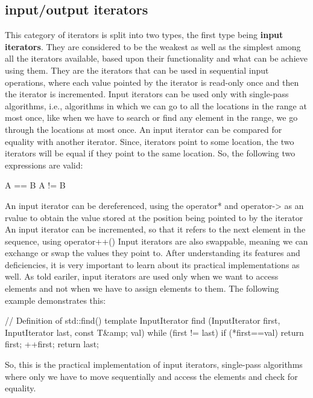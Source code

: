 \documentclass{report}
\begin{document}
\subsection*{input/output iterators}
This category of iterators is split into two types, the first type being \textbf{input iterators}. They are considered to be the weakest as well as the simplest among all the iterators available, based upon their functionality and what can be achieve using them. They are the iterators that can be used in sequential input operations, where each value pointed by the iterator is read-only once and then the iterator is incremented.
\bigbreak \noindent
Input iterators can be used only with single-pass algorithms, i.e., algorithms in which we can go to all the locations in the range at most once, like when we have to search or find any element in the range, we go through the locations at most once.
\bigbreak \noindent
An input iterator can be compared for equality with another iterator. Since, iterators point to some location, the two iterators will be equal if they point to the same location. So, the following two expressions are valid:
\begin{cppcode}
 A == B 
 A != B
\end{cppcode}
\noindent An input iterator can be dereferenced, using the operator* and operator-> as an rvalue to obtain the value stored at the position being pointed to by the iterator
\bigbreak \noindent
An input iterator can be incremented, so that it refers to the next element in the sequence, using operator++()
\noindent Input iterators are also swappable, meaning we can exchange or swap the values they point to.
\bigbreak \noindent
After understanding its features and deficiencies, it is very important to learn about its practical implementations as well. As told eariler, input iterators are used only when we want to access elements and not when we have to assign elements to them. The following example demonstrates this:
\begin{cppcode}
 // Definition of std::find() template 
 InputIterator find (InputIterator first, InputIterator last, const T&amp; val) 
 {
   while (first != last) {
     if (*first==val) { return first; }
     ++first;
   }
   return last;
 }
\end{cppcode}
\noindent So, this is the practical implementation of input iterators, single-pass algorithms where only we have to move sequentially and access the elements and check for equality.
\end{document}
